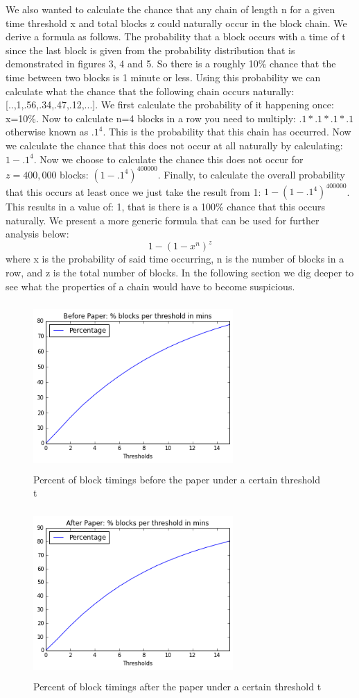 \documentclass{sig-alternate-05-2015}
\begin{document}
We also wanted to calculate the chance that any chain of length n for a given time threshold x and total blocks z could naturally occur in the block chain. We derive a formula as follows. The probability that a block occurs with a time of t since the last block is given from the probability distribution that is demonstrated in figures 3, 4 and 5. So there is a roughly 10\% chance that the time between two blocks is 1 minute or less. Using this probability we can calculate what the chance that the following chain occurs naturally: [..,1,.56,.34,.47,.12,...]. We first calculate the probability of it happening once: x=10\%. Now to calculate n=4 blocks in a row you need to multiply: \(.1*.1*.1*.1\) otherwise known as \(.1^4\). This is the probability that this chain has occurred. Now we calculate the chance that this does not occur at all naturally by calculating: \(1-.1^4\). Now we choose to calculate the chance this does not occur for \(z=400,000\) blocks: \((1-.1^4)^{400000}\). Finally, to calculate the overall probability that this occurs at least once we just take the result from 1:  \(1-(1-.1^4)^{400000}\). This results in a value of: 1, that is there is a 100\% chance that this occurs naturally. We present a more generic formula that can be used for further analysis below: \[1-(1-x^n)^{z}\]  where x is the probability of said time occurring, n is the number of blocks in a row, and z is the total number of blocks. In the following section we dig deeper to see what the properties of a chain would have to become suspicious.
\begin{figure}
\centering
\includegraphics[height=2.5in, width=3in]{before.png}
\caption{ Percent of block timings before the paper under a certain threshold t}
\end{figure}

\begin{figure}
\centering
\includegraphics[height=2.5in, width=3in]{after.png}
\caption{ Percent of block timings after the paper under a certain threshold t}
\end{figure}
\end{document}
